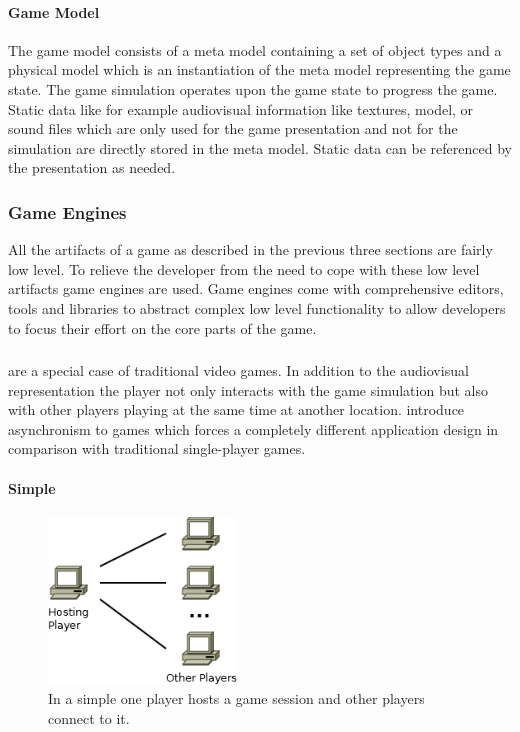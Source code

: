 \paragraph{Game Model}

The game model consists of a meta model containing a set of object types and a
physical model which is an instantiation of the meta model representing the game
state. The game simulation operates upon the game state to progress the game.
Static data like for example audiovisual information like textures, model, or
sound files which are only used for the game presentation and not for the
simulation are directly stored in the meta model. Static data can be referenced
by the presentation as needed.

\subsubsection{Game Engines}
All the artifacts of a game as described in the previous three sections are
fairly low level. To relieve the developer from the need to cope with these low
level artifacts game engines are used. Game engines come with comprehensive
editors, tools and libraries to abstract complex low level functionality to
allow developers to focus their effort on the core parts of the game.

\subsubsection{\ogsucuc{}}
\ogsuc{} are a special case of traditional video games. In addition to the
audiovisual representation the player not only interacts with the game
simulation but also with other players playing at the same time at another
location. \ogsuc{} introduce asynchronism to games which forces a completely
different application design in comparison with traditional single-player games.

\paragraph{Simple \ogsucuc{}}

\begin{figure}
	\centering
	\includegraphics[width=5cm]{images/SimpleOnlineGame}
	\caption{In a simple \og{} one player hosts a game session and other players
	connect to it.}
	\label{fig:simple_online_game}
\end{figure}

